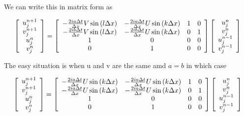 \documentclass[12pt]{article}
\begin{document}
We can write this in matrix form as

\[\left[\begin{array}{c}
u^{n+1}_j \\
v^{n+1}_j \\
u^{n}_j \\
v^{n}_j \\
\end{array} \right] = \left[\begin{array}{c c c c}
- \frac{2ia\Delta t}{\Delta x}V\sin\left(l\Delta x\right) & - \frac{2ia \Delta t}{\Delta x}U\sin\left(k\Delta x\right) & 1 & 0 \\
- \frac{2ib\Delta t}{\Delta x}V\sin\left(l\Delta x\right) & - \frac{2ib \Delta t}{\Delta x}U\sin\left(k\Delta x\right) & 0 & 1 \\
1&0&0&0 \\
0&1&0&0 \\
\end{array} \right]\left[\begin{array}{c}
u^{n}_j \\
v^{n}_j \\
u^{n-1}_j \\
v^{n-1}_j \\
\end{array} \right]\]

The easy situation is when u and v are the same amd $a=b$ in which case

\[\left[\begin{array}{c}
u^{n+1}_j \\
v^{n+1}_j \\
u^{n}_j \\
v^{n}_j \\
\end{array} \right] = \left[\begin{array}{c c c c}
- \frac{2ia\Delta t}{\Delta x}U\sin\left(k\Delta x\right) &- \frac{2ia\Delta t}{\Delta x}U\sin\left(k\Delta x\right) & 1 & 0 \\
- \frac{2ia\Delta t}{\Delta x}U\sin\left(k\Delta x\right) & - \frac{2ia\Delta t}{\Delta x}U\sin\left(k\Delta x\right) & 0 & 1 \\
1&0&0&0 \\
0&1&0&0 \\
\end{array} \right]\left[\begin{array}{c}
u^{n}_j \\
v^{n}_j \\
u^{n-1}_j \\
v^{n-1}_j \\
\end{array} \right]\]
\end{document}
